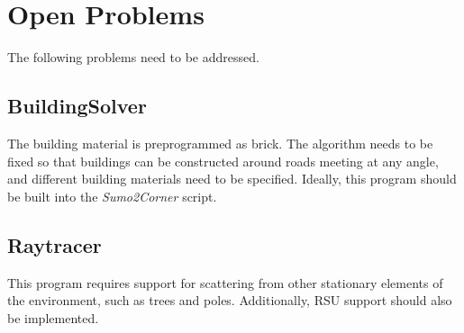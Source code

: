 \section{Open Problems}

The following problems need to be addressed.

\subsection{BuildingSolver}

The building material is preprogrammed as brick. The algorithm needs to be fixed so that buildings can be constructed around roads meeting at any angle, and different building materials need to be specified. Ideally, this program should be built into the \textit{Sumo2Corner} script.

\subsection{Raytracer}

This program requires support for scattering from other stationary elements of the environment, such as trees and poles. Additionally, RSU support should also be implemented.

